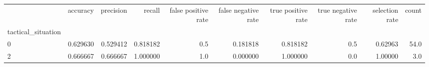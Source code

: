\begin{tabular}{lrrrrrrrrr}
\toprule
{} &  accuracy &  precision &    recall &  false positive rate &  false negative rate &  true positive rate &  true negative rate &  selection rate &  count \\
tactical\_situation &           &            &           &                      &                      &                     &                     &                 &        \\
\midrule
0                  &  0.629630 &   0.529412 &  0.818182 &                  0.5 &             0.181818 &            0.818182 &                 0.5 &         0.62963 &   54.0 \\
2                  &  0.666667 &   0.666667 &  1.000000 &                  1.0 &             0.000000 &            1.000000 &                 0.0 &         1.00000 &    3.0 \\
\bottomrule
\end{tabular}
